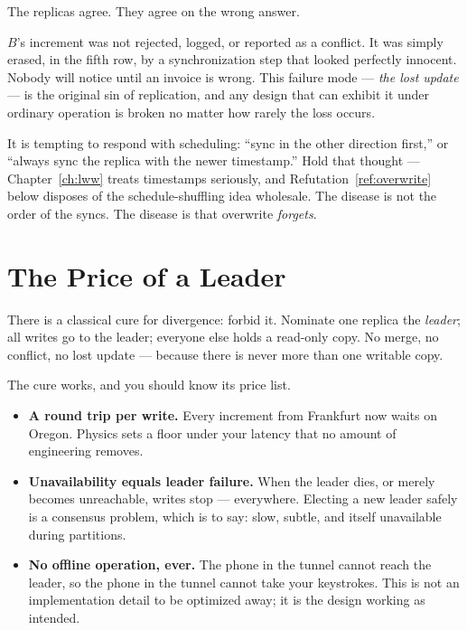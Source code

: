 \documentclass[12pt, a4paper, openright]{book}
\theoremstyle{thmstyle}
\theoremstyle{defstyle}
\begin{document}
The replicas agree. They agree on the wrong answer.

$B$'s increment was not rejected, logged, or reported as a conflict. It
was simply erased, in the fifth row, by a synchronization step that
looked perfectly innocent. Nobody will notice until an invoice is wrong.
This failure mode --- \emph{the lost update} --- is the original sin of
replication, and any design that can exhibit it under ordinary operation
is broken no matter how rarely the loss occurs.

It is tempting to respond with scheduling: ``sync in the other
direction first,'' or ``always sync the replica with the newer
timestamp.'' Hold that thought --- Chapter~\ref{ch:lww} treats timestamps
seriously, and Refutation~\ref{ref:overwrite} below disposes of the
schedule-shuffling idea wholesale. The disease is not the order of the
syncs. The disease is that overwrite \emph{forgets}.

\section{The Price of a Leader}

There is a classical cure for divergence: forbid it. Nominate one
replica the \emph{leader}; all writes go to the leader; everyone else
holds a read-only copy. No merge, no conflict, no lost update ---
because there is never more than one writable copy.

The cure works, and you should know its price list.

\begin{itemize}
  \item \textbf{A round trip per write.} Every increment from Frankfurt
    now waits on Oregon. Physics sets a floor under your latency that no
    amount of engineering removes.
  \item \textbf{Unavailability equals leader failure.} When the leader
    dies, or merely becomes unreachable, writes stop --- everywhere.
    Electing a new leader safely is a consensus problem, which is to say:
    slow, subtle, and itself unavailable during partitions.
  \item \textbf{No offline operation, ever.} The phone in the tunnel
    cannot reach the leader, so the phone in the tunnel cannot take your
    keystrokes. This is not an implementation detail to be optimized
    away; it is the design working as intended.
\end{itemize}
\end{document}
